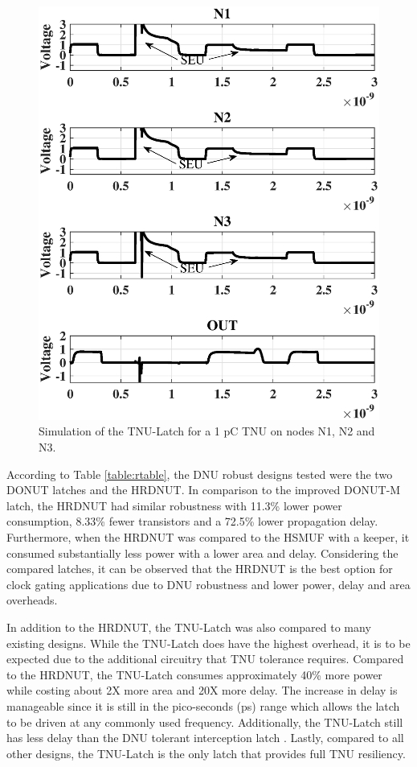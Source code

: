 \begin{figure}[!htbp]
	\centering
	\includegraphics[width=0.75\linewidth]{Figures/largechargetnu}
	\caption{Simulation of the TNU-Latch for a 1 pC TNU on nodes N1, N2 and N3.}
	\label{TNULarge_fig}
\end{figure}

According to Table \ref{table:rtable}, the DNU robust designs tested were the two DONUT latches and the HRDNUT. In comparison to the improved DONUT-M latch, the HRDNUT had similar robustness with 11.3\% lower power consumption, 8.33\% fewer transistors and a 72.5\% lower propagation delay. Furthermore, when the HRDNUT was compared to the HSMUF with a keeper, it consumed substantially less power with a lower area and delay. Considering the compared latches, it can be observed that the HRDNUT is the best option for clock gating applications due to DNU robustness and lower power, delay and area overheads.

In addition to the HRDNUT, the TNU-Latch was also compared to many existing designs. While the TNU-Latch does have the highest overhead, it is to be expected due to the additional circuitry that TNU tolerance requires. Compared to the HRDNUT, the TNU-Latch consumes approximately 40\% more power while costing about 2X more area and 20X more delay. The increase in delay is manageable since it is still in the pico-seconds (ps) range which allows the latch to be driven at any commonly used frequency. Additionally, the TNU-Latch still has less delay than the DNU tolerant interception latch \cite{Inter}. Lastly, compared to all other designs, the TNU-Latch is the only latch that provides full TNU resiliency.